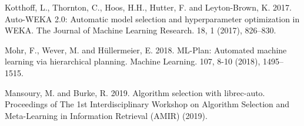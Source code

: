 \documentclass{article}
\begin{document}
\begin{thebibliography}{9}
Kotthoff, L., Thornton, C., Hoos, H.H., Hutter, F. and Leyton-Brown, K. 2017. Auto-WEKA 2.0: Automatic model selection and hyperparameter optimization in WEKA. The Journal of Machine Learning Research. 18, 1 (2017), 826–830.

Mohr, F., Wever, M. and Hüllermeier, E. 2018. ML-Plan: Automated machine learning via hierarchical planning. Machine Learning. 107, 8-10 (2018), 1495–1515.

Mansoury, M. and Burke, R. 2019. Algorithm selection with librec-auto. Proceedings of The 1st Interdisciplinary Workshop on Algorithm Selection and Meta-Learning in Information Retrieval (AMIR) (2019).

\end{thebibliography}



\end{document}

